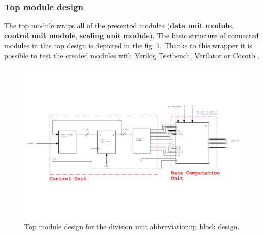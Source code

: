 \documentclass[a4paper, twoside, 11pt]{article}
\newcommand{\fbar}{\FloatBarrier}
\begin{document}
\subsubsection{Top module design}\label{subsubsec:division-top-module-design}
The top module wraps all of the presented modules (\textbf{data unit module}, \textbf{control unit module}, \textbf{scaling unit module}). The basic structure of connected modules in this top design is depicted in the fig. \ref{fig:division-top-module}. Thanks to this wrapper it is possible to test the created modules with Verilog Testbench, Verilator \cite{verilator} or Cocotb \cite{cocotb}.
\begin{figure}[htbp!]
  \centering
  \includegraphics[width=1\textwidth]{src/pdf/top-module.pdf}
   \caption{Top module design for the division unit \gls{abbreviation:ip} block design.}
  \label{fig:division-top-module}
\end{figure}



\fbar
\end{document}
